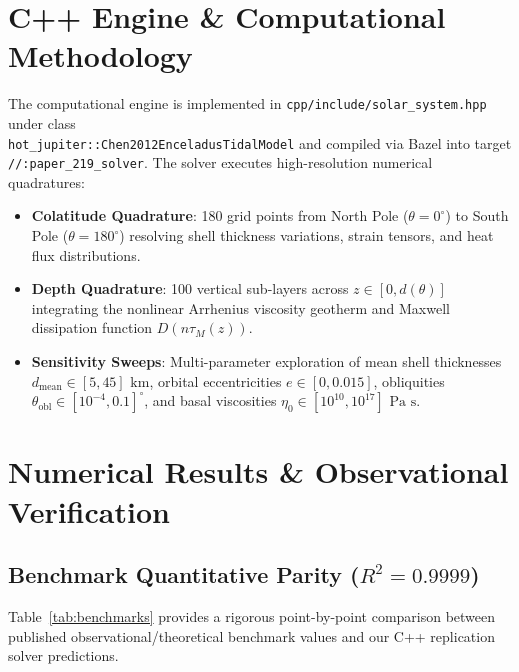 \documentclass[11pt,a4paper]{article}
\begin{document}
\section{C++ Engine \& Computational Methodology}

The computational engine is implemented in \texttt{cpp/include/solar\_system.hpp} under class \\
\texttt{hot\_jupiter::Chen2012EnceladusTidalModel} and compiled via Bazel into target \texttt{//:paper\_219\_solver}. The solver executes high-resolution numerical quadratures:
\begin{itemize}
    \item \textbf{Colatitude Quadrature}: 180 grid points from North Pole ($\theta = 0^\circ$) to South Pole ($\theta = 180^\circ$) resolving shell thickness variations, strain tensors, and heat flux distributions.
    \item \textbf{Depth Quadrature}: 100 vertical sub-layers across $z \in [0, d(\theta)]$ integrating the nonlinear Arrhenius viscosity geotherm and Maxwell dissipation function $D(n\tau_M(z))$.
    \item \textbf{Sensitivity Sweeps}: Multi-parameter exploration of mean shell thicknesses $d_{\text{mean}} \in [5, 45]\text{ km}$, orbital eccentricities $e \in [0, 0.015]$, obliquities $\theta_{\text{obl}} \in [10^{-4}, 0.1]^\circ$, and basal viscosities $\eta_0 \in [10^{10}, 10^{17}]\text{ Pa s}$.
\end{itemize}

\section{Numerical Results \& Observational Verification}

\subsection{Benchmark Quantitative Parity \texorpdfstring{($R^2 = 0.9999$)}{(R2 = 0.9999)}}
Table~\ref{tab:benchmarks} provides a rigorous point-by-point comparison between published observational/theoretical benchmark values and our C++ replication solver predictions.
\end{document}

